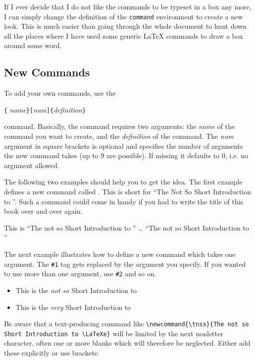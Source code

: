 If I ever decide that I do not like the commands to be typeset in
a box any more, I can simply change the definition of the
\texttt{command} environment to create a new look. This is much
easier than going through the whole document to hunt down all the
places where I have used some generic \LaTeX{} commands to draw a
box around some word. 


\subsection{New Commands}

To add your own commands, use the
\begin{command}
\verb|{|%
       \emph{name}\verb|}[|\emph{num}\verb|]{|\emph{definition}\verb|}|
\end{command}
\noindent command. 
Basically, the command requires two arguments: the \emph{name} of the
command you want to create, and the \emph{definition} of the command.
The \emph{num} argument in square brackets is optional and specifies the number
of arguments the new command takes (up to 9 are possible).
If missing it defaults to 0, i.e. no argument allowed.

The following two examples should help you to get the idea.
The first example defines a new command called . This is
short for ``The Not So Short Introduction to \LaTeXe''. Such a command
could come in handy if you had to write the title of this book over 
and over again. 

\begin{example}
\newcommand{\tnss}{The not
    so Short Introduction to
    \LaTeXe}
This is ``\tnss'' \ldots{} 
``\tnss''
\end{example}

The next example illustrates how to define a new
command which takes one argument.
The \verb|#1| tag gets replaced by the argument you specify.
If you wanted to use more than one argument, use \verb|#2| and
so on.

\begin{example}
\newcommand{\txsit}[1]
 {This is the \emph{#1} Short 
      Introduction to \LaTeXe}
\begin{itemize}
\item \txsit{not so}
\item \txsit{very}
\end{itemize}
\end{example}

Be aware that a text-producing command like
\verb|\newcommand{\tnss}{The not so Short Introduction to \LaTeXe}|
will be limited by the next nonletter character, often one or
more blanks which will therefore be neglected. Either add
these explicitly or use brackets:


